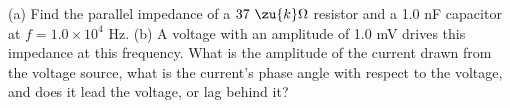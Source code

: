 (a) Find the parallel impedance of a $37\ \zu{k}\Omega$ resistor and
        a 1.0 nF capacitor at $f=1.0\times10^4$ Hz.\answercheck\hwendpart
        (b) A voltage with an amplitude of 1.0 mV drives this impedance at this
        frequency. What is the amplitude of the current drawn from the
        voltage source,  what is the current's phase angle with respect to the
        voltage, and does it lead the voltage, or lag behind it?\answercheck
